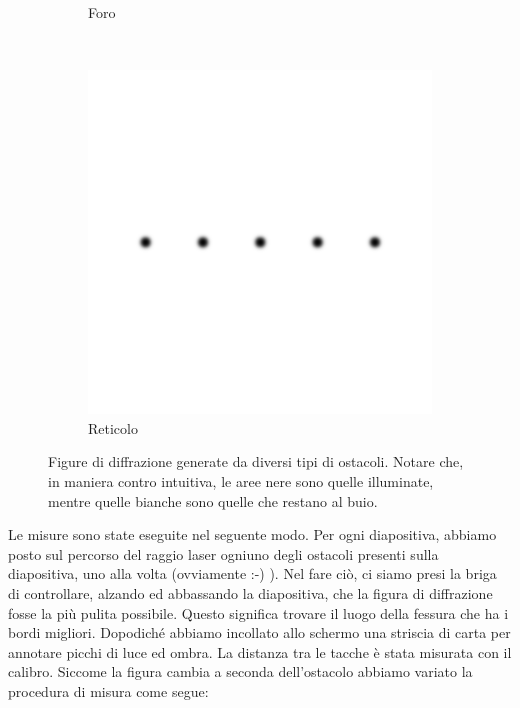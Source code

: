 \begin{figure}[b!]
\begin{subfigure}[b]{0.3\textwidth}
        \caption{Foro}
        \label{fig:foro}
    \end{subfigure}
    ~ %
    \begin{subfigure}[b]{0.3\textwidth}
        \includegraphics[width=\textwidth]{f3.png}
        \caption{Reticolo}
        \label{fig:ret}
    \end{subfigure}
    \caption{Figure di diffrazione generate da diversi tipi di ostacoli. Notare che, in maniera contro intuitiva,
        le aree nere sono quelle illuminate, mentre quelle bianche sono quelle che restano al buio.}
    \label{fig:diff}
\end{figure}

Le misure sono state eseguite nel seguente modo. Per ogni diapositiva, abbiamo posto sul percorso del raggio laser ogniuno degli ostacoli
presenti sulla diapositiva, uno alla volta (ovviamente :-) ). Nel fare ciò, ci siamo presi la briga di controllare, alzando ed abbassando
la diapositiva, che la figura di diffrazione fosse la più pulita possibile. Questo significa trovare il luogo della fessura che ha i bordi
migliori. Dopodiché abbiamo incollato allo schermo una striscia di carta per annotare picchi di luce ed ombra. La distanza tra le tacche
è stata misurata con il calibro. Siccome la figura cambia a seconda dell'ostacolo abbiamo variato la procedura di misura come segue:

